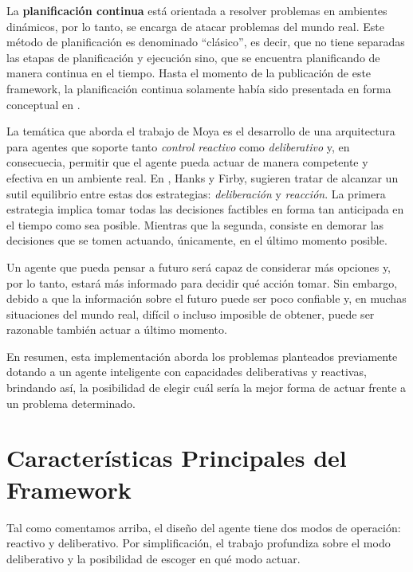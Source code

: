 La {\bf planificaci\'on continua} est\'a orientada a resolver problemas
en ambientes din\'amicos, por lo tanto, se encarga de atacar
problemas del mundo real. Este m\'etodo de planificaci\'on es denominado
``cl\'asico'', es decir, que no tiene separadas las etapas de 
planificaci\'on y ejecuci\'on sino, que se encuentra planificando
de manera continua en el tiempo. Hasta el momento de la
publicaci\'on de este framework, la planificaci\'on continua solamente
hab\'ia sido presentada en forma conceptual en \cite{russell03:_artif_intel}.
	
La tem\'atica que aborda el trabajo de Moya es el desarrollo de 
una arquitectura para agentes que soporte tanto \emph{control
reactivo} como \emph{deliberativo} y, en consecuecia, permitir que el agente
pueda actuar de manera competente y efectiva en un ambiente real.
En \cite{hanks90:_issues_in_archit_for_plann_and_execut}, Hanks y Firby, 
sugieren tratar de alcanzar un sutil
equilibrio entre estas dos estrategias: \emph{deliberaci\'on}
y \emph{reacci\'on}. La primera estrategia implica tomar todas las decisiones
factibles en forma tan anticipada en el tiempo como sea posible.
Mientras que la segunda, consiste en demorar las decisiones
que se tomen actuando, \'unicamente, en el \'ultimo momento posible.

Un agente que pueda pensar a futuro ser\'a capaz de considerar m\'as
opciones y, por lo tanto, estar\'a m\'as informado para decidir
qu\'e acci\'on tomar. Sin embargo, debido a que la informaci\'on
sobre el futuro puede ser poco confiable y, en muchas
situaciones del mundo real, dif\'icil o incluso imposible de obtener,
puede ser razonable tambi\'en actuar a \'ultimo momento.

En resumen, esta implementaci\'on aborda los problemas planteados
previamente dotando a un agente inteligente con 
capacidades deliberativas y reactivas, brindando as\'i,
la posibilidad de elegir cu\'al ser\'ia la mejor forma de
actuar frente a un problema determinado.  



\section{Caracter\'isticas Principales del Framework} \label{cap3:caracter\'isticas}

Tal como comentamos arriba, el dise\~{n}o del agente tiene
dos modos de operaci\'on: reactivo y deliberativo. Por simplificaci\'on,
el trabajo profundiza sobre el modo deliberativo y la posibilidad
de escoger en qu\'e modo actuar.

